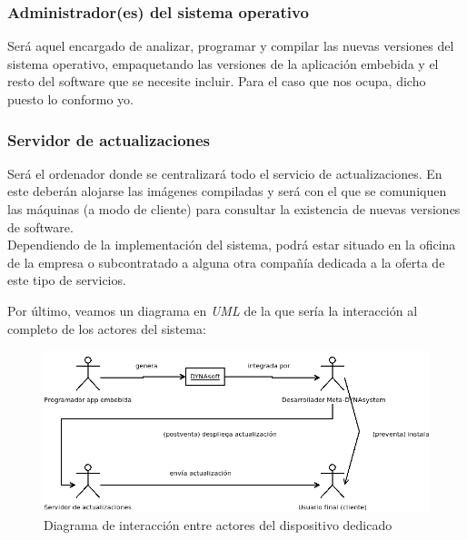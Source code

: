 \subsubsection{Administrador(es) del sistema operativo}

Será aquel encargado de analizar, programar y compilar las nuevas versiones del sistema operativo, empaquetando las versiones de la aplicación embebida y el resto del software que se necesite incluir. Para el caso que nos ocupa, dicho puesto lo conformo yo.

\subsubsection{Servidor de actualizaciones}
	
Será el ordenador donde se centralizará todo el servicio de actualizaciones. En este deberán alojarse las imágenes compiladas y será con el que se comuniquen las máquinas (a modo de cliente) para consultar la existencia de nuevas versiones de software.\\

Dependiendo de la implementación del sistema, podrá estar situado en la oficina de la empresa o subcontratado a alguna otra compañía dedicada a la oferta de este tipo de servicios.

Por último, veamos un diagrama en \textit{UML} de la que sería la interacción al completo de los actores del sistema:

\begin{figure}[H]
	\centering
	\includegraphics[width=\linewidth]{imagenes/statechart-actores.png}
	\caption{Diagrama de interacción entre actores del dispositivo dedicado}
	\label{statechart-actores}
\end{figure}

\newpage
